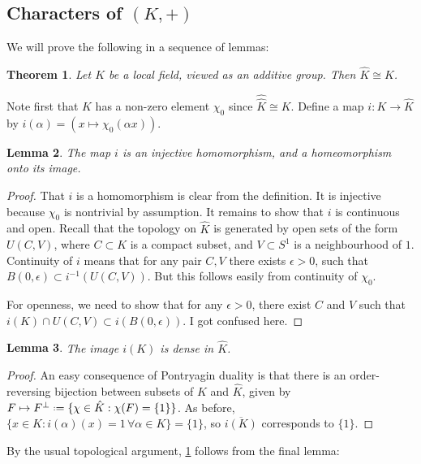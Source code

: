 \documentclass[11pt]{report}
\newcommand{\1}{\mathbbm 1}
\newcommand*{\defeq}{\mathrel{\vcenter{\baselineskip0.5ex \lineskiplimit0pt
      \hbox{\scriptsize.}\hbox{\scriptsize.}}}%
  =}
\theoremstyle{plain}
\newtheorem{thm}{Theorem}[section]
\newcounter{ex}
\newtheorem{lemma}[thm]{Lemma}
\theoremstyle{definition}
\theoremstyle{remark}
\numberwithin{equation}{section}
\begin{document}
\subsection{Characters of \texorpdfstring{$(K,+)$}{(K,+)}}
\label{sec:characters-k}
We will prove the following in a sequence of lemmas:
\begin{thm}\label{thm:local-dual}
  Let $K$ be a local field, viewed as an additive group. Then $\hat K \cong K$. 
\end{thm}

Note first that $\hat K$ has a non-zero element $\chi_{0}$ since
$\hat{\hat K} \cong K$. Define a map $i : K \to \hat K$ by $i(\alpha) = (x \mapsto
\chi_{0}(\alpha x))$.

\begin{lemma}
The map $i$ is an injective homomorphism, and a homeomorphism onto its
image.   
\end{lemma}

\begin{proof}
  That $i$ is a homomorphism is clear from the definition. It is
  injective because $\chi_{0}$ is nontrivial by assumption. It remains to
  show that $i$ is continuous and open. Recall that the topology on
  $\hat K$ is generated by open sets of the form $U(C,V)$, where $C \subset
  K$ is a compact subset, and $V \subset S^{1}$ is a neighbourhood of
  $1$. Continuity of $i$ means that for any pair $C,V$ there exists $\epsilon >0$,
  such that $B(0,\epsilon) \subset i^{-1}(U(C,V))$. But this follows easily from
  continuity of $\chi_{0}$.

  For openness, we need to show that for any $\epsilon >0$, there exist $C$
  and $V$ such that $i(K) \cap U(C,V) \subset i(B(0,\epsilon))$. {\color{red} I got
    confused here.}
\end{proof}

\begin{lemma}
The image $i(K)$ is dense in $\hat K$.
\end{lemma}

\begin{proof}
  An easy consequence of Pontryagin duality is that there is an
  order-reversing bijection between subsets of $K$ and $\hat
  K$, given by $F \mapsto F^{\perp} \defeq \{\chi \in \hat K : \chi(F) =
  \{1\}\}$. As before, $\{x \in K : i(\alpha)(x) = 1 \, \forall \alpha \in K\} = \{1\}$,
  so $\overline{i(K)}$ corresponds to $\{1\}$.
\end{proof}
By the usual topological argument, \cref{thm:local-dual} follows from
the final lemma:
\end{document}
